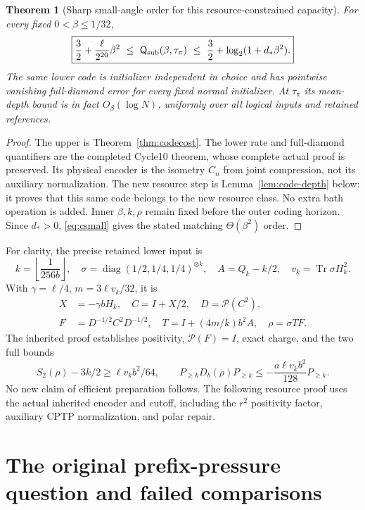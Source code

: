 \documentclass[11pt]{article}
\newtheorem{theorem}{Theorem}[section]
\newcommand{\Tr}{\operatorname{Tr}}
\newcommand{\Qcap}{\mathsf Q}
\newcommand{\pin}{\mathcal P}
\begin{document}
\begin{theorem}[Sharp small-angle order for this resource-constrained capacity]
\label{thm:sublinear}
For every fixed \(0<\beta\le1/32\),
\begin{equation}\label{eq:sublinearcapacity}
 \boxed{\frac32+\frac{\ell}{2^{20}}\beta^2
 \ \le\ \Qcap_{\rm sub}(\beta,\tau_\pi)
 \ \le\ \frac32+\log_2(1+d_*\beta^2).}
\end{equation}
The same lower code is initializer independent in choice and has
pointwise vanishing full-diamond error for every fixed normal initializer.
At \(\tau_\pi\) its mean-depth bound is in fact \(O_\beta(\log N)\),
uniformly over all logical inputs and retained references.
\end{theorem}
\begin{proof}
The upper is Theorem~\ref{thm:codecost}. The lower rate and full-diamond
quantifiers are the completed Cycle10 theorem, whose complete actual
proof is preserved. Its physical encoder is the isometry \(C_n\)
from joint compression, not its auxiliary normalization.
The new resource step is Lemma~\ref{lem:code-depth} below: it proves
that this same code belongs to the new resource class. No extra bath
operation is added. Inner \(\beta,k,\rho\) remain fixed before the outer
coding horizon. Since \(d_*>0\), \eqref{eq:csmall} gives the stated
matching \(\Theta(\beta^2)\) order.
\end{proof}

For clarity, the precise retained lower input is
\[
 k=\left\lfloor\frac1{256b}\right\rfloor,\quad
 \sigma=\operatorname{diag}(1/2,1/4,1/4)^{\otimes k},\quad
 A=Q_k-k/2,\quad v_k=\Tr\sigma H_k^2.
\]
With \(\gamma=\ell/4\), \(m=3\ell v_k/32\), it is
\begin{align*}
 X&=-\gamma bH_k,\quad C=I+X/2,\quad D=\pin(C^2),\\
 F&=D^{-1/2}C^2D^{-1/2},\quad
 T=I+(4m/k)b^2A,\quad \rho=\sigma TF.
\end{align*}
The inherited proof establishes positivity, \(\pin(F)=I\), exact charge,
and the two full bounds
\[
 S_2(\rho)-3k/2\ge\ell v_kb^2/64,\qquad
 P_{\ge k}D_b(\rho)P_{\ge k}\le
 -\frac{a\ell v_kb^2}{128}P_{\ge k}.
\]
No new claim of efficient preparation follows. The following resource
proof uses the actual inherited encoder and cutoff, including the
\(r^2\) positivity factor, auxiliary CPTP normalization, and polar repair.



\section{The original prefix-pressure question and failed comparisons}
\end{document}
